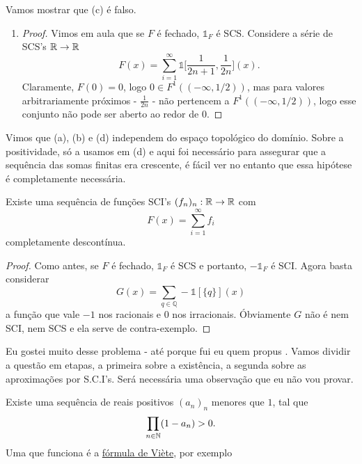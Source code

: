 Vamos mostrar que (c) é falso.
\begin{enumerate}[label=(\alph*)]
    \addtocounter{enumi}{2}
    \item \begin{proof}
        Vimos em aula que se $F$ é fechado, $\mathds{1}_F$ é SCS. Considere a série de SCS's $\mathbb{R} \rightarrow \mathbb{R}$
        $$F(x) = \sum_{i=1}^{\infty} \mathds{1}\bigg[\frac{1}{2n+1}, \frac{1}{2n}\bigg](x).$$
        Claramente, $F(0) = 0$, logo $ 0 \in F^{1}((-\infty, 1/2))$, mas para valores arbitrariamente próximos - $\frac{1}{2n}$ -  não 
        pertencem a $F^{1}((-\infty, 1/2))$, logo esse conjunto não pode ser aberto ao redor de $0$. 
    \end{proof}
\end{enumerate}
Vimos que (a), (b) e (d) independem do espaço topológico do domínio. Sobre a positividade, só a usamos em (d) e aqui foi necessário para assegurar que 
a sequência das somas finitas era crescente, é fácil ver no entanto que essa hipótese é completamente necessária.
\begin{prop}
    Existe uma sequência de funções SCI's $(f_n)_n : \mathbb{R} \rightarrow \mathbb{R}$ com 
    $$F(x) = \sum_{i=1}^{\infty} f_i$$
    completamente descontínua. 
\end{prop}
\begin{proof}
    Como antes, se $F$ é fechado, $\mathds{1}_F$ é SCS e portanto, $-\mathds{1}_F$ é SCI. Agora basta considerar
    $$G(x) = \sum_{q \in \mathbb{Q}} - \mathds{1}[\{q\}] (x)$$
    a função que vale $-1$ nos racionais e $0$ nos irracionais. Óbviamente $G$ não é nem SCI, nem SCS e ela serve de contra-exemplo.

\end{proof}

\begin{problem}
    \label{prob:l5:2}
\end{problem}
Eu gostei muito desse problema - até porque fui eu quem propus \Smiley.
Vamos dividir a questão em etapas, a primeira sobre a existência, a segunda sobre as aproximações por S.C.I's.
Será necessária uma observação que eu não vou provar.
\begin{remark}
    Existe uma sequência de reais positivos $(a_n)_n$ menores que $1$, tal que 
    $$\prod_{n \in \mathbb{N}} (1 - a_n) > 0.$$
    Uma que funciona é a \href{https://en.wikipedia.org/wiki/Vi%C3%A8te%27s_formula}{fórmula de Viète}, por exemplo
\end{remark}

